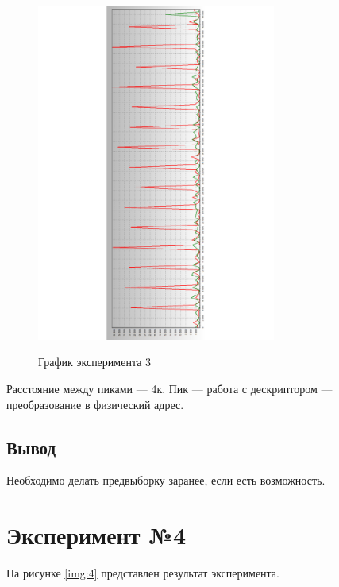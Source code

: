 \begin{figure}[H]
	\caption{График эксперимента 3}
	\includegraphics[width=0.7\textwidth, angle=90]{img/3.pdf}
	\label{img:3}
\end{figure}

Расстояние между пиками --- 4к. Пик --- работа с дескриптором --- преобразование в физический адрес.

\subsection*{Вывод}

Необходимо делать предвыборку заранее, если есть возможность.

\section{Эксперимент №4}

На рисунке \ref{img:4} представлен результат эксперимента.

